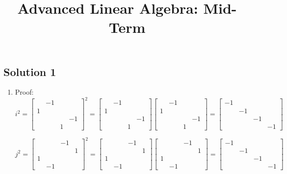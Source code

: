 \documentclass{article}
\title{Advanced Linear Algebra: Mid-Term}
\begin{document}
\maketitle
\subsection*{Solution 1}
\begin{enumerate}
    \item Proof:
    \[i^2=\left[
    \begin{array}{cccc}
     & -1 \\
    1 & \\
    &&& -1 \\
    && 1
    \end{array}
    \right]^2=\left[
    \begin{array}{cccc}
     & -1 \\
    1 & \\
    &&& -1 \\
    && 1
    \end{array}
    \right]\left[
    \begin{array}{cccc}
     & -1 \\
    1 & \\
    &&& -1 \\
    && 1
    \end{array}
    \right]=\left[
    \begin{array}{cccc}
    -1 \\ & -1 \\ & & -1 \\ & & & -1
    \end{array}
    \right]\]
    
    \[j^2=\left[
    \begin{array}{cccc}
     & & -1 \\
     & & & 1 \\
    1 \\
     & -1
    \end{array}
    \right]^2=
    \left[
    \begin{array}{cccc}
     & & -1 \\
     & & & 1 \\
    1 \\
     & -1
    \end{array}
    \right]
    \left[
    \begin{array}{cccc}
     & & -1 \\
     & & & 1 \\
    1 \\
     & -1
    \end{array}
    \right]=
    \left[
    \begin{array}{cccc}
    -1 \\ & -1 \\ & & -1 \\ & & & -1
    \end{array}
    \right]
    \]
    

\end{enumerate}
\end{document}
